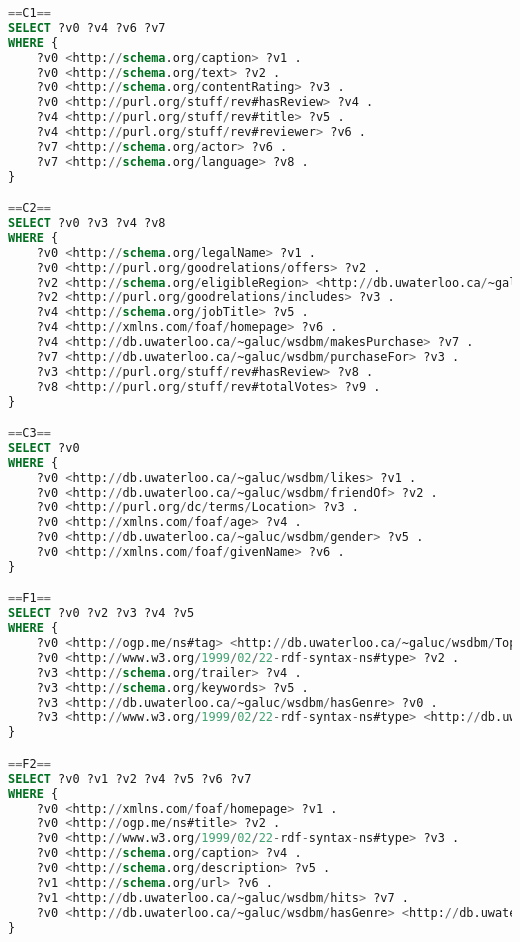 \begin{lstlisting}[language=SQL, basicstyle=\ttfamily\scriptsize,morekeywords={PREFIX,OPTIONAL,FILTER,java,rdf,rdfs,url},breaklines=true,showstringspaces=false,label=watdiv-sparql-queries,basewidth=0.5em]
==C1==
SELECT ?v0 ?v4 ?v6 ?v7 
WHERE {
    ?v0 <http://schema.org/caption> ?v1 .
    ?v0 <http://schema.org/text> ?v2 .
    ?v0 <http://schema.org/contentRating> ?v3 .
    ?v0 <http://purl.org/stuff/rev#hasReview> ?v4 .
    ?v4 <http://purl.org/stuff/rev#title> ?v5 .
    ?v4 <http://purl.org/stuff/rev#reviewer> ?v6 .
    ?v7 <http://schema.org/actor> ?v6 .
    ?v7 <http://schema.org/language> ?v8 .
}

==C2==
SELECT ?v0 ?v3 ?v4 ?v8 
WHERE {
    ?v0 <http://schema.org/legalName> ?v1 .
    ?v0 <http://purl.org/goodrelations/offers> ?v2 .
    ?v2 <http://schema.org/eligibleRegion> <http://db.uwaterloo.ca/~galuc/wsdbm/Country5> .
    ?v2 <http://purl.org/goodrelations/includes> ?v3 .
    ?v4 <http://schema.org/jobTitle> ?v5 .
    ?v4 <http://xmlns.com/foaf/homepage> ?v6 .
    ?v4 <http://db.uwaterloo.ca/~galuc/wsdbm/makesPurchase> ?v7 .
    ?v7 <http://db.uwaterloo.ca/~galuc/wsdbm/purchaseFor> ?v3 .
    ?v3 <http://purl.org/stuff/rev#hasReview> ?v8 .
    ?v8 <http://purl.org/stuff/rev#totalVotes> ?v9 .
}

==C3==
SELECT ?v0 
WHERE {
    ?v0 <http://db.uwaterloo.ca/~galuc/wsdbm/likes> ?v1 .
    ?v0 <http://db.uwaterloo.ca/~galuc/wsdbm/friendOf> ?v2 .
    ?v0 <http://purl.org/dc/terms/Location> ?v3 .
    ?v0 <http://xmlns.com/foaf/age> ?v4 .
    ?v0 <http://db.uwaterloo.ca/~galuc/wsdbm/gender> ?v5 .
    ?v0 <http://xmlns.com/foaf/givenName> ?v6 .
}

==F1==
SELECT ?v0 ?v2 ?v3 ?v4 ?v5 
WHERE {
    ?v0 <http://ogp.me/ns#tag> <http://db.uwaterloo.ca/~galuc/wsdbm/Topic13> .
    ?v0 <http://www.w3.org/1999/02/22-rdf-syntax-ns#type> ?v2 .
    ?v3 <http://schema.org/trailer> ?v4 .
    ?v3 <http://schema.org/keywords> ?v5 .
    ?v3 <http://db.uwaterloo.ca/~galuc/wsdbm/hasGenre> ?v0 .
    ?v3 <http://www.w3.org/1999/02/22-rdf-syntax-ns#type> <http://db.uwaterloo.ca/~galuc/wsdbm/ProductCategory2> .
}

==F2==
SELECT ?v0 ?v1 ?v2 ?v4 ?v5 ?v6 ?v7 
WHERE {
    ?v0 <http://xmlns.com/foaf/homepage> ?v1 .
    ?v0 <http://ogp.me/ns#title> ?v2 .
    ?v0 <http://www.w3.org/1999/02/22-rdf-syntax-ns#type> ?v3 .
    ?v0 <http://schema.org/caption> ?v4 .
    ?v0 <http://schema.org/description> ?v5 .
    ?v1 <http://schema.org/url> ?v6 .
    ?v1 <http://db.uwaterloo.ca/~galuc/wsdbm/hits> ?v7 .
    ?v0 <http://db.uwaterloo.ca/~galuc/wsdbm/hasGenre> <http://db.uwaterloo.ca/~galuc/wsdbm/SubGenre22> .
}


\end{lstlisting}
